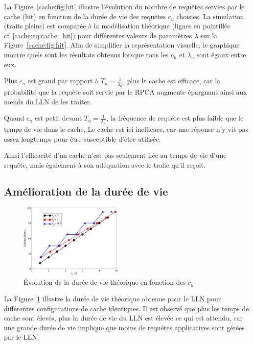 La Figure~\ref{cache:fig:hit} illustre l'évolution du nombre de requêtes servies par le cache (hit) en fonction de la durée de vie des requêtes $c_u$ choisies.
La simulation (traits pleins) est comparée à la modélisation théorique (lignes en pointillés cf~\eqref{cache:eq:cache_hit}) pour différentes valeurs de paramètres $\lambda$ sur la Figure~\ref{cache:fig:hit}.
Afin de simplifier la représentation visuelle, le graphique montre quels sont les résultats obtenus lorsque tous les $c_u$ et $\lambda_u$ sont égaux entre eux.

Plus $c_u$ est grand par rapport à $T_u = \frac{1}{\lambda_u}$, plus le cache est efficace, car la probabilité que la requête soit servie par le \ac{RPCA} augmente épargnant ainsi aux nœuds du \ac{LLN} de les traiter.

Quand $c_u$ est petit devant $T_u = \frac{1}{\lambda_u}$, la fréquence de requête est plus faible que le temps de vie dans le cache.
Le cache est ici inefficace, car une réponse n'y vit pas assez longtemps pour être susceptible d'être utilisée.

Ainsi l'efficacité d'un cache n'est pas seulement liée au temps de vie d'une requête, mais également à son adéquation avec le trafic qu'il reçoit.

\subsection{Amélioration de la durée de vie}

\begin{figure}[ht]
  \centering
  \includegraphics[width=0.455\textwidth]{img/lifetime.pdf}
  \caption{Évolution de la durée de vie théorique en fonction des $c_u$}
  \label{cache:fig:lifetime}
\end{figure}

La Figure~\ref{cache:fig:lifetime} illustre la durée de vie théorique obtenue pour le \ac{LLN} pour différentes configurations de cache identiques.
Il est observé que plus les temps de cache sont élevés, plus la durée de vie du \ac{LLN} est élevée ce qui est attendu, car une grande durée de vie implique que moins de requêtes applicatives sont gérées par le \ac{LLN}.

